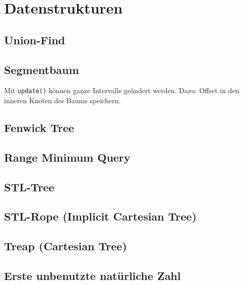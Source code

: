 \section{Datenstrukturen}

\subsection{Union-Find}


\subsection{Segmentbaum}

Mit \lstinline{update()} können ganze Intervalle geändert werden.
Dazu: Offset in den inneren Knoten des Baums speichern.

\subsection{Fenwick Tree}



\subsection{Range Minimum Query}


\subsection{STL-Tree}


\subsection{STL-Rope (Implicit Cartesian Tree)}


\subsection{Treap (Cartesian Tree)}


\subsection{Erste unbenutzte natürliche Zahl}

